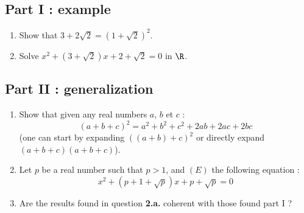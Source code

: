 \documentclass[12pt,a4paper,article,english,firamath]{nsi}
\begin{document}
\subsection*{Part I : example}
\begin{enumerate}
    \item 	Show that $3+2\sqrt{2}=\left(1+\sqrt{2}\right)^2$.
    \item 	Solve $x^2+\left(3+\sqrt{2}\right)x+2+\sqrt{2}=0$ in $\R$.
\end{enumerate}
\subsection*{Part II : generalization}
\begin{enumerate}
    \item 	Show that given any real numbers $a$, $b$ et $c$ :
            $$\left(a+b+c\right)^2=a^2+b^2+c^2+2ab+2ac+2bc$$
            (one can start by expanding $\left(\left(a+b\right)+c\right)^2$ or directly expand  $\left(a+b+c\right)\left(a+b+c\right)$).
    \item 	Let $p$ be a real number such that $p>1$, and $(E)$ the following equation :
            $$x^2+\left(p+1+\sqrt{p}\right)x+p+\sqrt{p}=0$$
    \item 	Are the results found in question \textbf{2.a.} coherent with those found part I ?
\end{enumerate}
\end{document}
